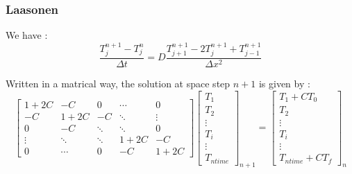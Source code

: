 \documentclass{article}
\begin{document}
                    \subsubsection{Laasonen}
    
                    We have :
                    \begin{equation}
                        \frac{T_{j}^{n+1} - T_{j}^n}{\Delta t} = D \frac{T_{j+1}^{n+1}- 2T_{j}^{n+1} + T_{j-1}^{n+1}}{\Delta x^2}
                    \end{equation}
    
                    Written in a matrical way, the solution at space step $n+1$ is given by :
                    \begin{equation}
                        \label{eq:laas}
                        \begin{bmatrix}
                            1+2C   & -C     & 0      & \cdots & 0 \\
                            -C     & 1+2C   & -C     & \ddots & \vdots \\
                            0      & -C     & \ddots & \ddots & 0 \\
                            \vdots & \ddots & \ddots & 1+2C   & -C\\
                            0      & \cdots & 0      & -C     & 1+2C
                        \end{bmatrix}
                        \begin{bmatrix}
                            T_{1} \\
                            T_{2} \\
                            \vdots \\
                            T_{i} \\
                            \vdots \\
                            T_{ntime}
                        \end{bmatrix}_{n+1}
                        =
                        \begin{bmatrix}
                            T_{1} + CT_{0}\\
                            T_{2} \\
                            \vdots \\
                            T_{i} \\
                            \vdots \\
                            T_{ntime} + CT_{f}
                        \end{bmatrix}_{n}
                    \end{equation}
\end{document}
